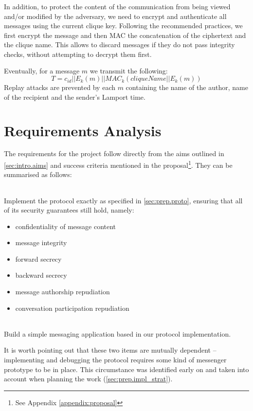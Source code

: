 \documentclass[a4paper, 12pt]{report}
\begin{document}
In addition, to protect the content of the communication from being viewed and/or modified by the adversary, we need to encrypt and authenticate all messages using the current clique key. Following the recommended practices, we first encrypt the message and then MAC the concatenation of the ciphertext and the clique name. This allows to discard messages if they do not pass integrity checks, without attempting to decrypt them first.

Eventually, for a message $m$ we transmit the following:
\begin{equation*}
    T = c_{id} || E_k(m) || MAC_k(cliqueName || E_k(m))
\end{equation*}
Replay attacks are prevented by each $m$ containing the name of the author, name of the recipient and the sender's Lamport time.

\section{Requirements Analysis}
\label{sec:prep.requirements}
The requirements for the project follow directly from the aims outlined in \cref{sec:intro.aims} and success criteria mentioned in the proposal\footnote{See Appendix \ref{appendix:proposal}}. They can be summarised as follows:
\begin{description}[labelindent=0.5cm, leftmargin=1.3cm, rightmargin=0.5cm]
    \item[Implementing the protocol] \hfill \\
        Implement the protocol exactly as specified in \cref{sec:prep.proto}, ensuring that all of its security guarantees still hold, namely:
        \begin{itemize}
            \item confidentiality of message content
            \item message integrity
            \item forward secrecy
            \item backward secrecy
            \item message authorship repudiation
            \item conversation participation repudiation
        \end{itemize}


    \item[Construct a useable messaging application] \hfill \\
        Build a simple messaging application based in our protocol implementation.     
\end{description}
It is worth pointing out that these two items are mutually dependent -- implementing and debugging the protocol requires some kind of messenger prototype to be in place. This circumstance was identified early on and taken into account when planning the work (\cref{sec:prep.impl_strat}). \\
\end{document}
